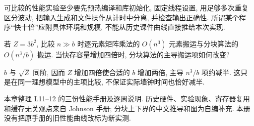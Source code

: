 可比较的性能实验至少要先预热编译和库初始化, 固定线程设置, 用足够多次重复区分波动, 把输入生成和文件操作从计时中分离, 并检查输出正确性. 所谓某个程序“快十倍”应附具体环境和规模, 不能从历史课件曲线直接推给本次实现.

\begin{exercise}
若 $Z=3b^2$, 比较 $n\gg b$ 时逐元素矩阵乘法的 $O(n^3)$ 元素搬运与分块算法的 $O(n^3/b)$ 搬运. 当快存容量增加四倍时, 分块算法的主导搬运项如何改变?
\end{exercise}
\begin{solution}
$b$ 与 $\sqrt Z$ 同阶, 因而 $Z$ 增加四倍使合适的 $b$ 增加两倍, 主导 $n^3/b$ 项约减半. 这只是在同一理想模型中的主项比较, 不保证实际墙钟时间也恰好减半.
\end{solution}
\begin{remark}
本章整理 L11--12 的三份性能手册及逐周说明. 历史硬件、实验现象、寄存器复用和缓存无关观点来自 Johnson 手册; 分块上下界的中文推导和图为自编补充. 本册没有把原手册的旧性能曲线改标为新实测.
\end{remark}
